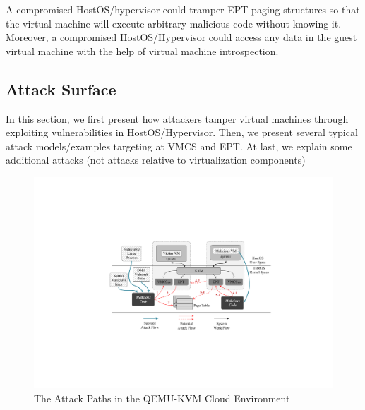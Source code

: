 A compromised HostOS/hypervisor could tramper EPT paging structures so that the virtual machine will execute arbitrary malicious code without knowing it. 
Moreover, a compromised HostOS/Hypervisor could access any data in the guest virtual machine with the help of virtual machine introspection.




\subsection{Attack Surface}\label{sub:attacksurface}

In this section, we first present how attackers tamper virtual machines through exploiting vulnerabilities in HostOS/Hypervisor. Then, we present several typical attack models/examples targeting at VMCS and EPT. At last, we explain some additional attacks (not attacks relative to virtualization components)

\begin{figure}[htpb]
    \centering
    \includegraphics[width=1\linewidth]{IMG/threat.pdf}
    \caption{The Attack Paths in the QEMU-KVM Cloud Environment}%
    \label{fig:threat}
\end{figure}

